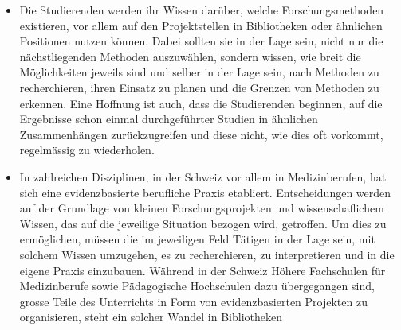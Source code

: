 \documentclass[a4paper,
fontsize=11pt,
oneside,
numbers=noperiodatend,
parskip=half-,
bibliography=totoc,
final
]{scrartcl}
\begin{document}
\begin{itemize}
\item
  Die Studierenden werden ihr Wissen darüber, welche Forschungsmethoden
  existieren, vor allem auf den Projektstellen in Bibliotheken oder
  ähnlichen Positionen nutzen können. Dabei sollten sie in der Lage
  sein, nicht nur die nächstliegenden Methoden auszuwählen, sondern
  wissen, wie breit die Möglichkeiten jeweils sind und selber in der
  Lage sein, nach Methoden zu recherchieren, ihren Einsatz zu planen und
  die Grenzen von Methoden zu erkennen. Eine Hoffnung ist auch, dass die
  Studierenden beginnen, auf die Ergebnisse schon einmal durchgeführter
  Studien in ähnlichen Zusammenhängen zurückzugreifen und diese nicht,
  wie dies oft vorkommt, regelmässig zu wiederholen.
\item
  In zahlreichen Disziplinen, in der Schweiz vor allem in
  Medizinberufen, hat sich eine evidenzbasierte berufliche Praxis
  etabliert. Entscheidungen werden auf der Grundlage von kleinen
  Forschungsprojekten und wissenschaflichem Wissen, das auf die
  jeweilige Situation bezogen wird, getroffen. Um dies zu ermöglichen,
  müssen die im jeweiligen Feld Tätigen in der Lage sein, mit solchem
  Wissen umzugehen, es zu recherchieren, zu interpretieren und in die
  eigene Praxis einzubauen. Während in der Schweiz Höhere Fachschulen
  für Medizinberufe sowie Pädagogische Hochschulen dazu übergegangen
  sind, grosse Teile des Unterrichts in Form von evidenzbasierten
  Projekten zu organisieren, steht ein solcher Wandel in Bibliotheken


\end{itemize}
\end{document}
